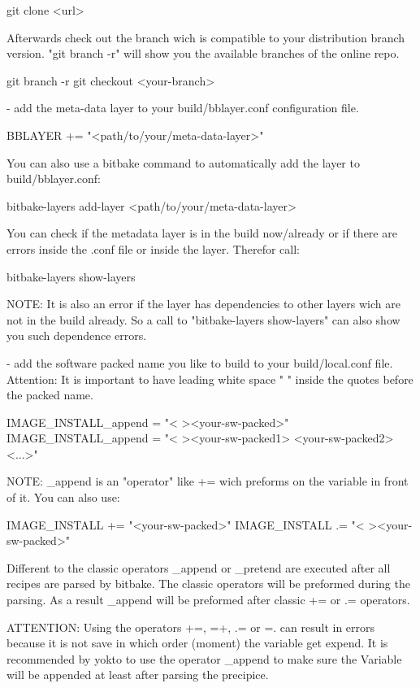        git clone <url>

    Afterwards check out the branch wich is compatible to your distribution
    branch version. "git branch -r" will show you the available branches of the
    online repo.

        git branch -r
        git checkout <your-branch>


- add the meta-data layer to your build/bblayer.conf configuration file.

        BBLAYER += "<path/to/your/meta-data-layer>"

    You can also use a bitbake command to automatically add the layer to
    build/bblayer.conf:

        bitbake-layers add-layer <path/to/your/meta-data-layer>

    You can check if the metadata layer is in the build now/already or if
    there are errors inside the .conf file or inside the layer. Therefor call:

        bitbake-layers show-layers

    NOTE: It is also an error if the layer has dependencies to other layers wich
    are not in the build already. So a call to "bitbake-layers show-layers" can
    also show you such dependence errors.

- add the software packed name you like to build to your build/local.conf file.
    Attention: It is important to have leading white space " " inside the quotes
    before the packed name.

        IMAGE_INSTALL_append = "< ><your-sw-packed>"
        IMAGE_INSTALL_append = "< ><your-sw-packed1> <your-sw-packed2> <...>"

    NOTE: _append is an "operator" like += wich preforms on the variable in
    front of it. You can also use:

        IMAGE_INSTALL += "<your-sw-packed>"
        IMAGE_INSTALL .= "< ><your-sw-packed>"

    Different to the classic operators _append or _pretend are executed after
    all recipes are parsed by bitbake. The classic operators will be preformed
    during the parsing. As a result _append will be preformed after classic
    += or .= operators.

    ATTENTION: Using the operators +=, =+, .= or =. can result in errors because
    it is not save in which order (moment) the variable get expend. It is
    recommended by yokto to use the operator _append to make sure the Variable
    will be appended at least after parsing the precipice.

